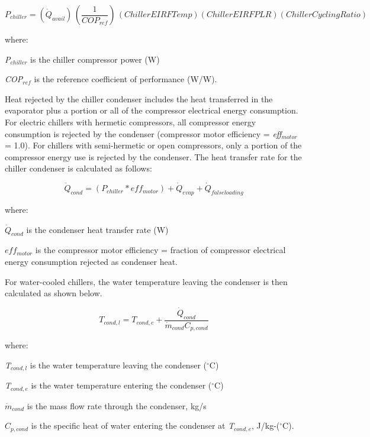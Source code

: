 \begin{equation}
{P_{chiller}} = \left( {{\dot{Q}_{avail}}} \right)\,\left( {\frac{1}{{CO{P_{ref}}}}} \right)\,\left( {ChillerEIRFTemp} \right)\left( {ChillerEIRFPLR} \right)\left( {ChillerCyclingRatio} \right)
\end{equation}

where:

\emph{P\(_{chiller}\)} is the chiller compressor power (W)

\emph{COP\(_{ref}\)} is the reference coefficient of performance (W/W).

Heat rejected by the chiller condenser includes the heat transferred in the evaporator plus a portion or all of the compressor electrical energy consumption. For electric chillers with hermetic compressors, all compressor energy consumption is rejected by the condenser (compressor motor efficiency = \emph{eff\(_{motor}\)} = 1.0). For chillers with semi-hermetic or open compressors, only a portion of the compressor energy use is rejected by the condenser. The heat transfer rate for the chiller condenser is calculated as follows:

\begin{equation}
{\dot{Q}_{cond}} = \left( {{P_{chiller}} * ef{f_{motor}}} \right) + {\dot{Q}_{evap}} + {\dot{Q}_{falseloading}}
\end{equation}

where:

\({\dot{Q}_{cond}}\) is the condenser heat transfer rate (W)

\(ef{f_{motor}}\) is the compressor motor efficiency = fraction of compressor electrical energy consumption rejected as condenser heat.

For water-cooled chillers, the water temperature leaving the condenser is then calculated as shown below.

\begin{equation}
  T_{cond,l} = T_{cond,e} + \frac{\dot{Q}_{cond}}{\dot{m}_{cond}C_{p,cond}}
\end{equation}

where:

\emph{T\(_{cond,l}\)} is the water temperature leaving the condenser (\(^{\circ}\)C)

\emph{T\(_{cond,e}\)} is the water temperature entering the condenser (\(^{\circ}\)C)

\({\dot{m}_{cond}}\) is the mass flow rate through the condenser, kg/s

\({C_{p,cond}}\) is the specific heat of water entering the condenser at \emph{T\(_{cond,e}\)}, J/kg-(\(^{\circ}\)C).

